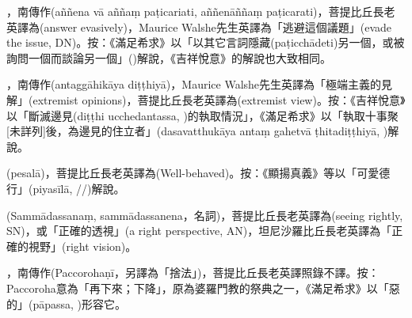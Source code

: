 \startitemgroup[noteitems]
\item{}，南傳作(aññena vā aññaṃ paṭicariati, aññenāññaṃ paṭicarati)，菩提比丘長老英譯為(answer evasively)，Maurice Walshe先生英譯為「逃避這個議題」(evade the issue, DN)。按：《滿足希求》以「以其它言詞隱藏(paṭicchādeti)另一個，或被詢問一個而談論另一個」()解說，《吉祥悅意》的解說也大致相同。
\stopitemgroup

\startitemgroup[noteitems]
\item{}，南傳作(antaggāhikāya diṭṭhiyā)，Maurice Walshe先生英譯為「極端主義的見解」(extremist opinions)，菩提比丘長老英譯為(extremist view)。按：《吉祥悅意》以「斷滅邊見(diṭṭhi ucchedantassa, )的執取情況」，《滿足希求》以「執取十事聚[未詳列]後，為邊見的住立者」(dasavatthukāya antaṃ gahetvā ṭhitadiṭṭhiyā, )解說。
\stopitemgroup

\startitemgroup[noteitems]
\item{}(pesalā)，菩提比丘長老英譯為(Well-behaved)。按：《顯揚真義》等以「可愛德行」(piyasīlā, //)解說。
\stopitemgroup

\startitemgroup[noteitems]
\item{}(Sammādassanaṃ, sammādassanena，名詞)，菩提比丘長老英譯為(seeing rightly, SN)，或「正確的透視」(a right perspective, AN)，坦尼沙羅比丘長老英譯為「正確的視野」(right vision)。
\stopitemgroup

\startitemgroup[noteitems]
\item{}，南傳作(Paccorohaṇī，另譯為「捨法」)，菩提比丘長老英譯照錄不譯。按：Paccoroha意為「再下來；下降」，原為婆羅門教的祭典之一，《滿足希求》以「惡的」(pāpassa, )形容它。
\stopitemgroup

